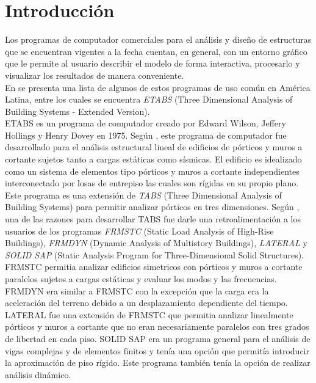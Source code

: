 \chapter{Introducción}
\label{chap:antecedentes}

Los programas de computador comerciales para el análisis y diseño de estructuras que se encuentran vigentes a la fecha cuentan, en general, con un entorno gráfico que le permite al usuario describir el modelo de forma interactiva, procesarlo y visualizar los resultados de manera conveniente.\\

En \cite{escamilla1995microcomputadores} se presenta una lista de algunos de estos programas de uso común en América Latina, entre los cuales se encuentra \emph{ETABS} (Three Dimensional Analysis of Building Systems - Extended Version).\\

ETABS es un programa de computador creado por Edward Wilson, Jeffery Hollings y Henry Dovey en 1975. Según \cite{ETABS1975}, este programa de computador fue desarrollado para el análisis estructural lineal de edificios de pórticos y muros a cortante sujetos tanto a cargas estáticas como sísmicas. El edificio es idealizado como un sistema de elementos tipo pórticos y muros a cortante independientes interconectado por losas de entrepiso las cuales son rígidas en su propio plano. \\

Este programa es una extensión de \emph{TABS} (Three Dimensional Analysis of  Building Systems) para permitir analizar pórticos en tres dimensiones. Según \cite{ETABS1972}, una de las razones para desarrollar TABS fue darle una retroalimentación a los usuarios de los programas \emph{FRMSTC} (Static Load Analysis of High-Rise Buildings), \emph{FRMDYN} (Dynamic Analysis of Multistory Buildings), \emph{LATERAL} y \emph{SOLID SAP} (Static Analysis Program for Three-Dimensional Solid Structures).\\

FRMSTC permitia analizar edificios simetricos con pórticos y muros a cortante paralelos sujetos a cargas estáticas y evaluar los modos y las frecuencias. FRMDYN era similar a FRMSTC con la excepción que la carga era la aceleración del terreno debido a un desplazamiento dependiente del tiempo. LATERAL fue una extensión de FRMSTC que permitia analizar linealmente pórticos y muros a cortante que no eran necesariamente paralelos con tres grados de libertad en cada piso. SOLID SAP era un programa general para el análisis de vigas complejas y de elementos finitos y tenía una opción que permitía introducir la aproximación de piso rígido. Este programa también tenía la opción de realizar análisis dinámico.\\

